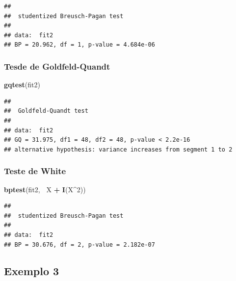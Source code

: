 \documentclass[a4paper, 12pt]{article}
\newenvironment{Shaded}{\begin{snugshade}}{\end{snugshade}}
\newcommand{\DecValTok}[1]{\textcolor[rgb]{0.00,0.00,0.81}{#1}}
\newcommand{\KeywordTok}[1]{\textcolor[rgb]{0.13,0.29,0.53}{\textbf{#1}}}
\newcommand{\NormalTok}[1]{#1}
\newcommand{\OperatorTok}[1]{\textcolor[rgb]{0.81,0.36,0.00}{\textbf{#1}}}
\newcommand{\StringTok}[1]{\textcolor[rgb]{0.31,0.60,0.02}{#1}}
\begin{document}
\begin{verbatim}
## 
##  studentized Breusch-Pagan test
## 
## data:  fit2
## BP = 20.962, df = 1, p-value = 4.684e-06
\end{verbatim}

\hypertarget{tesde-de-goldfeld-quandt-1}{%
\subsubsection{Tesde de
Goldfeld-Quandt}\label{tesde-de-goldfeld-quandt-1}}

\begin{Shaded}
\begin{Highlighting}[]
\KeywordTok{gqtest}\NormalTok{(fit2)}
\end{Highlighting}
\end{Shaded}

\begin{verbatim}
## 
##  Goldfeld-Quandt test
## 
## data:  fit2
## GQ = 31.975, df1 = 48, df2 = 48, p-value < 2.2e-16
## alternative hypothesis: variance increases from segment 1 to 2
\end{verbatim}

\hypertarget{teste-de-white-2}{%
\subsubsection{Teste de White}\label{teste-de-white-2}}

\begin{Shaded}
\begin{Highlighting}[]
\KeywordTok{bptest}\NormalTok{(fit2, }\OperatorTok{~}\NormalTok{X }\OperatorTok{+}\StringTok{ }\KeywordTok{I}\NormalTok{(X}\OperatorTok{^}\DecValTok{2}\NormalTok{))}
\end{Highlighting}
\end{Shaded}

\begin{verbatim}
## 
##  studentized Breusch-Pagan test
## 
## data:  fit2
## BP = 30.676, df = 2, p-value = 2.182e-07
\end{verbatim}

\hypertarget{exemplo-3}{%
\subsection{Exemplo 3}\label{exemplo-3}}
\end{document}
